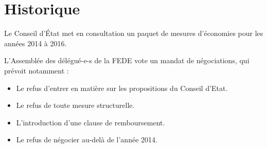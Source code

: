
\chapter{Historique}%
Le Conseil d'État met en consultation un paquet de mesures d'économies pour les années 2014 à 2016.

L’Assemblée des délégué-e-s de la FEDE vote un mandat de
négociations, qui prévoit notamment :
\begin{itemize}
			\item Le refus d’entrer en matière sur les propositions du Conseil d’Etat.
			\item Le refus de toute mesure structurelle.
			\item L’introduction d’une clause de remboursement.
			\item Le refus de négocier au-delà de l’année 2014.
		\end{itemize}

